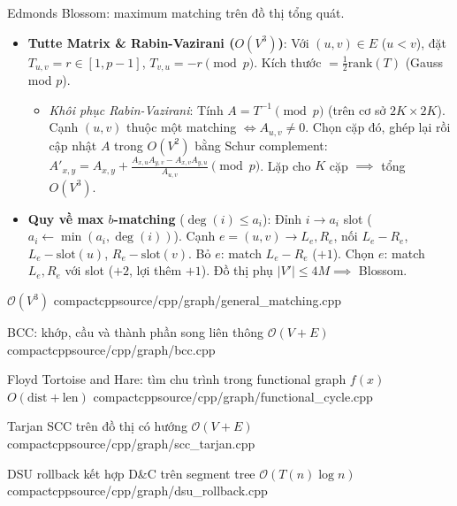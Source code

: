 {Edmonds Blossom: maximum matching trên đồ thị tổng quát.
\begin{itemize}
    \item \textbf{Tutte Matrix \& Rabin-Vazirani ($O(V^3)$)}: Với $(u,v)\in E$ ($u<v$), đặt $T_{u, v} = r \in [1, p-1]$, $T_{v, u} = -r \pmod p$. Kích thước $= \frac{1}{2}\text{rank}(T)$ (Gauss mod $p$).
    \begin{itemize}
        \item \textit{Khôi phục Rabin-Vazirani}: Tính $A=T^{-1}\pmod p$ (trên cơ sở $2K\times2K$). Cạnh $(u,v)$ thuộc một matching $\iff A_{u,v}\ne0$. Chọn cặp đó, ghép lại rồi cập nhật $A$ trong $O(V^2)$ bằng Schur complement: $A'_{x, y} = A_{x, y} + \frac{A_{x, u}A_{y, v} - A_{x, v}A_{y, u}}{A_{u, v}} \pmod p$. Lặp cho $K$ cặp $\implies$ tổng $O(V^3)$.
    \end{itemize}
    \item \textbf{Quy về max $b$-matching} ($\deg(i) \le a_i$): Đỉnh $i \to a_i$ slot ($a_i \leftarrow \min(a_i, \deg(i))$). Cạnh $e=(u,v) \to L_e, R_e$, nối $L_e - R_e$, $L_e - \text{slot}(u)$, $R_e - \text{slot}(v)$. Bỏ $e$: match $L_e-R_e$ ($+1$). Chọn $e$: match $L_e, R_e$ với slot ($+2$, lợi thêm $+1$). Đồ thị phụ $|V'| \le 4M \implies$ Blossom.
\end{itemize}
}
{$\mathcal{O}(V^3)$}
{compactcpp}{source/cpp/graph/general_matching.cpp}

{BCC: khớp, cầu và thành phần song liên thông}
{$\mathcal{O}(V + E)$}
{compactcpp}{source/cpp/graph/bcc.cpp}

{Floyd Tortoise and Hare: tìm chu trình trong functional graph $f(x)$}
{$O(\text{dist} + \text{len})$}
{compactcpp}{source/cpp/graph/functional_cycle.cpp}

{Tarjan SCC trên đồ thị có hướng}
{$\mathcal{O}(V + E)$}
{compactcpp}{source/cpp/graph/scc_tarjan.cpp}

{DSU rollback kết hợp D\&C trên segment tree}
{$\mathcal{O}(T(n) \log n)$}
{compactcpp}{source/cpp/graph/dsu_rollback.cpp}

